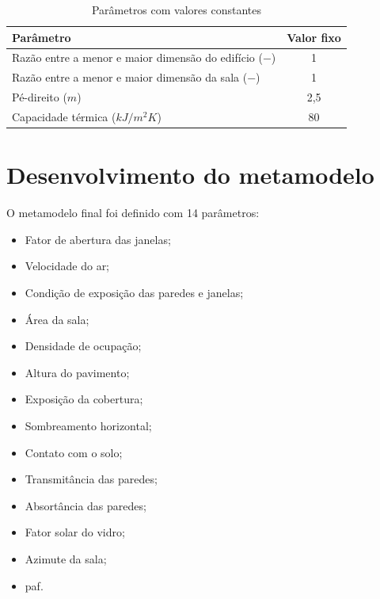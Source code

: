 \documentclass[brazil,hardcopy,openany]{ufscthesis} %
\begin{document}
\begin{table}[h]		
	\centering
	\caption{Parâmetros com valores constantes}
	\label{table:param_fixed}
	\begin{tabular}{|l |c |}
		\hline
		\textbf{Parâmetro} & Valor fixo \\
		\hline
		Razão entre a menor e maior dimensão do edifício ($-$) & 1 \\
		\hline
		Razão entre a menor e maior dimensão da sala ($-$) & 1 \\
		\hline
		Pé-direito ($m$) & 2,5 \\
		\hline
		Capacidade térmica ($kJ/m^2K$) & 80 \\
		\hline
	\end{tabular}
\end{table}

\newpage

\section{Desenvolvimento do metamodelo}
 
O metamodelo final foi definido com 14 parâmetros:
\begin{itemize}
	\item Fator de abertura das janelas;
	\item Velocidade do ar;
	\item Condição de exposição das paredes e janelas;
	\item Área da sala;
	\item Densidade de ocupação;
	\item Altura do pavimento;
	\item Exposição da cobertura;
	\item Sombreamento horizontal;
	\item Contato com o solo;
	\item Transmitância das paredes;
	\item Absortância das paredes;
	\item Fator solar do vidro;
	\item Azimute da sala;
	\item \Acrlong{paf}.
\end{itemize}
\end{document}
